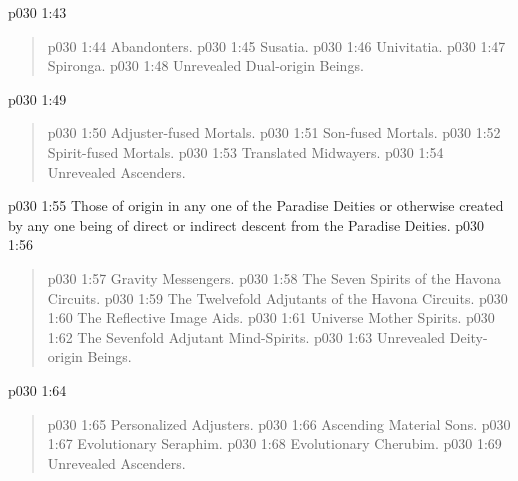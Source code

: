 \vsetspace
\vs p030 1:43 \bibnobreakspace {}
\begin{quote}
\vs p030 1:44 \bibnobreakspace Abandonters.
\vs p030 1:45 \bibnobreakspace Susatia.
\vs p030 1:46 \bibnobreakspace Univitatia.
\vs p030 1:47 \bibnobreakspace Spironga.
\vs p030 1:48 \bibnobreakspace Unrevealed Dual\hyp{}origin Beings.
\end{quote}
\vsetspace
\vs p030 1:49 \bibnobreakspace {}
\begin{quote}
\vs p030 1:50 \bibnobreakspace Adjuster\hyp{}fused Mortals.
\vs p030 1:51 \bibnobreakspace Son\hyp{}fused Mortals.
\vs p030 1:52 \bibnobreakspace Spirit\hyp{}fused Mortals.
\vs p030 1:53 \bibnobreakspace Translated Midwayers.
\vs p030 1:54 \bibnobreakspace Unrevealed Ascenders.
\end{quote}
\vsetspace
\vs p030 1:55 \bibnobreakspace {} Those of origin in any one of the Paradise Deities or otherwise created by any one being of direct or indirect descent from the Paradise Deities.
\vsetspace
\vs p030 1:56 \bibnobreakspace {}
\begin{quote}
\vs p030 1:57 \bibnobreakspace Gravity Messengers.
\vs p030 1:58 \bibnobreakspace The Seven Spirits of the Havona Circuits.
\vs p030 1:59 \bibnobreakspace The Twelvefold Adjutants of the Havona Circuits.
\vs p030 1:60 \bibnobreakspace The Reflective Image Aids.
\vs p030 1:61 \bibnobreakspace Universe Mother Spirits.
\vs p030 1:62 \bibnobreakspace The Sevenfold Adjutant Mind\hyp{}Spirits.
\vs p030 1:63 \bibnobreakspace Unrevealed Deity\hyp{}origin Beings.
\end{quote}
\vsetspace
\vs p030 1:64 \bibnobreakspace {}
\begin{quote}
\vs p030 1:65 \bibnobreakspace Personalized Adjusters.
\vs p030 1:66 \bibnobreakspace Ascending Material Sons.
\vs p030 1:67 \bibnobreakspace Evolutionary Seraphim.
\vs p030 1:68 \bibnobreakspace Evolutionary Cherubim.
\vs p030 1:69 \bibnobreakspace Unrevealed Ascenders.
\end{quote}
\vsetspace
